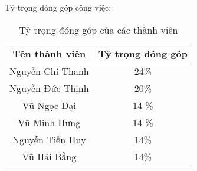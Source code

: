 Tỷ trọng đóng góp công việc:

\begin{table*}[h!]
    \centering
    \begin{tabular}{|c|c|}
        \hline
        Tên thành viên & Tỷ trọng đóng góp \\
        \hline
        Nguyễn Chí Thanh & 24\% \\
        \hline
        Nguyễn Đức Thịnh & 20\%  \\
        \hline
        Vũ Ngọc Đại & 14 \% \\
        \hline
        Vũ Minh Hưng & 14 \% \\
        \hline
        Nguyễn Tiến Huy & 14\% \\
        \hline
        Vũ Hải Bằng & 14\% \\
        \hline 
    \end{tabular}
    \caption*{Tỷ trọng đóng góp của các thành viên}
\end{table*}